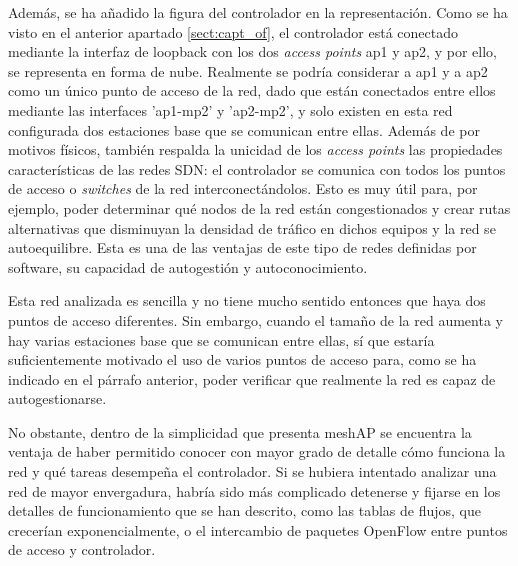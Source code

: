 \documentclass[a4paper,12pt,twoside,spanish]{book}
\begin{document}
Además, se ha añadido la figura del controlador en la representación. Como se ha visto en el anterior apartado \ref{sect:capt_of}, el controlador está conectado mediante la interfaz de loopback con los dos \textit{access points} ap1 y ap2, y por ello, se representa en forma de nube. Realmente se podría considerar a ap1 y a ap2 como un único punto de acceso de la red, dado que están conectados entre ellos mediante las interfaces 'ap1-mp2' y 'ap2-mp2', y solo existen en esta red configurada dos estaciones base que se comunican entre ellas. Además de por motivos físicos, también respalda la unicidad de los \textit{access points} las propiedades características de las redes SDN: el controlador se comunica con todos los puntos de acceso o \textit{switches} de la red interconectándolos. Esto es muy útil para, por ejemplo, poder determinar qué nodos de la red están congestionados y crear rutas alternativas que disminuyan la densidad de tráfico en dichos equipos y la red se autoequilibre. Esta es una de las ventajas de este tipo de redes definidas por software, su capacidad de autogestión y autoconocimiento.\par 

Esta red analizada es sencilla y no tiene mucho sentido entonces que haya dos puntos de acceso diferentes. Sin embargo, cuando el tamaño de la red aumenta y hay varias estaciones base que se comunican entre ellas, sí que estaría suficientemente motivado el uso de varios puntos de acceso para, como se ha indicado en el párrafo anterior, poder verificar que realmente la red es capaz de autogestionarse. \par 

No obstante, dentro de la simplicidad que presenta meshAP se encuentra la ventaja de haber permitido conocer con mayor grado de detalle cómo funciona la red y qué tareas desempeña el controlador. Si se hubiera intentado analizar una red de mayor envergadura, habría sido más complicado detenerse y fijarse en los detalles de funcionamiento que se han descrito, como las tablas de flujos, que crecerían exponencialmente, o el intercambio de paquetes OpenFlow entre puntos de acceso y controlador.\par
\end{document}
